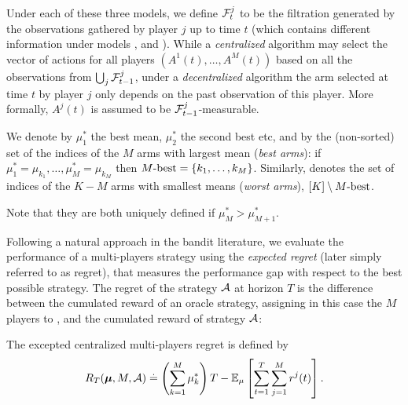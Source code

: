 Under each of these three models, we define $\mathcal{F}^j_t$ to be the filtration generated by the observations gathered by player $j$ up to time $t$ (which contains different information under models \modelun, \modeldeux{} and \modeltrois).
While a \emph{centralized} algorithm may select the vector of actions for all players $(A^1(t),\dots,A^M(t))$ based on all the observations from $\bigcup_j \mathcal{F}^j_{t-1}$, under a \emph{decentralized} algorithm the arm selected at time $t$ by player $j$ only depends on the past observation of this player.
More formally, $A^j(t)$ is assumed to be $\mathcal{F}^j_{t-1}$-measurable.

\begin{definition}\label{def:5:MbestMworst}
\begin{leftbar}[defnbar]  %
  We denote by $\mu_1^*$ the best mean, $\mu_2^*$ the second best etc, and
  by \Mbest{} the (non-sorted) set of the indices of the $M$ arms with largest mean (\emph{best arms}): if $\mu_1^* = \mu_{k_1}, \dots, \mu_M^* = \mu_{k_M}$
  then $M\text{-}\mathrm{best} = \{k_1, \dots, k_M\}$.
  Similarly, \Mworst{} denotes the set of indices of the $K-M$ arms with smallest means (\emph{worst arms}),
  $[K] \setminus M\text{-}\mathrm{best}$.

  Note that they are both uniquely defined if $\mu_M^* > \mu_{M+1}^*$.
\end{leftbar}  %
\end{definition}

Following a natural approach in the bandit literature, we evaluate the performance of a multi-players strategy using the \emph{expected regret} (later simply referred to as regret), that measures the performance gap with respect to the best possible strategy.
The regret of the strategy $\mathcal{A}$ at horizon $T$ is the difference between the cumulated reward of an oracle strategy, assigning in this case the $M$ players to \Mbest,
and the cumulated reward of strategy $\mathcal{A}$:

\begin{definition}
\begin{leftbar}[defnbar]  %
  The excepted centralized multi-players regret is defined by
  \begin{equation}\label{eq:5:regret}
    R_T(\boldsymbol{\mu}, M, \mathcal{A}) \overset{.}{=} \left(\sum_{k=1}^{M}\mu_k^*\right)T - \mathbb{E}_{\mu}\left[\sum_{t=1}^T\sum_{j=1}^M r^j(t)\right].
  \end{equation}
\end{leftbar}  %
\end{definition}

